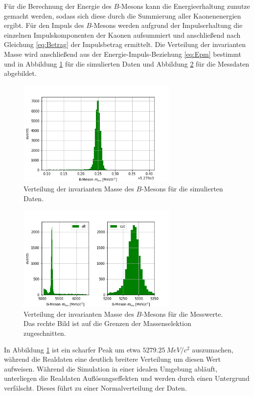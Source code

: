 Für die Berechnung der Energie des $B$-Mesons kann die Energieerhaltung zunutze gemacht werden, sodass sich diese durch die Summierung aller Kaonenenergien ergibt. Für den Impuls des $B$-Mesons werden aufgrund der Impulserhaltung die einzelnen Impulskomponenten der Kaonen aufsummiert und anschließend nach Gleichung \eqref{eq:Betrag} der Impulsbetrag ermittelt.
Die Verteilung der invarianten Masse wird anschließend aus der Energie-Impuls-Beziehung \eqref{eq:Epm} bestimmt und in Abbildung \ref{fig:Minv_sim} für die simulierten Daten und Abbildung \ref{fig:Minv_real} für die Messdaten abgebildet.
\begin{figure}
  \centering
  \includegraphics[width=0.7\textwidth]{plots/sim_Bmes_M.png}
  \caption{Verteilung der invarianten Masse des $B$-Mesons für die simulierten Daten.}
  \label{fig:Minv_sim}
\end{figure}
\begin{figure}
  \centering
  \includegraphics[width=0.7\textwidth]{plots/real_Bmes_M.png}
  \caption{Verteilung der invarianten Masse des $B$-Mesons für die Messwerte. Das rechte Bild ist auf die Grenzen der Massenselektion zugeschnitten.}
  \label{fig:Minv_real}
\end{figure}
\FloatBarrier
In Abbildung \ref{fig:Minv_sim} ist ein scharfer Peak um etwa $\SI{5279.25}{MeV/c^2}$ auszumachen, während die Realdaten eine deutlich breitere Verteilung um diesen Wert aufweisen. Während die Simulation in einer idealen Umgebung abläuft, unterliegen die Realdaten Auflösungseffekten und werden durch einen Untergrund verfälscht. Dieses führt zu einer Normalverteilung der Daten.

